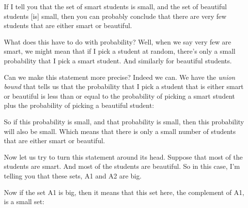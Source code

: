 \documentclass[pdftex, brazil, 12pt, twoside]{article}
\begin{document}
If I tell you that the set of smart students is small, and
the set of beautiful students [is] small, then you can
probably conclude that there are very few students that are
either smart or beautiful.

What does this have to do with probability?
Well, when we say very few are smart, we might mean that if I
pick a student at random, there's only a small
probability that I pick a smart student.
And similarly for beautiful students.

Can we make this statement more precise?
Indeed we can.
We have the \emph{union bound} that tells us that the probability
that I pick a student that is either smart or beautiful is
less than or equal to the probability of picking a smart
student plus the probability of
picking a beautiful student:

\begin{figure}[H]
  \begin{center}
  \end{center}
\end{figure}

So if this probability is small, and that probability is
small, then this probability will also be small.
Which means that there is only a small number of students
that are either smart or beautiful.

Now let us try to turn this statement around its head.
Suppose that most of the students are smart.
And most of the students are beautiful.
So in this case, I'm telling you that these sets,
A1 and A2 are big.

Now if the set A1 is big, then it means that this set here,
the complement of A1, is a small set:

\begin{figure}[H]
  \begin{center}
  \end{center}
\end{figure}
\end{document}
